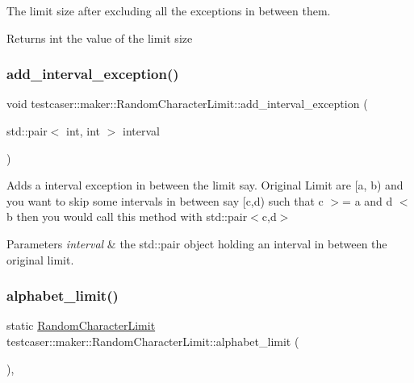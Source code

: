 The limit size after excluding all the exceptions in between them. 

\begin{DoxyReturn}{Returns}
int the value of the limit size 
\end{DoxyReturn}
\mbox{\label{classtestcaser_1_1maker_1_1RandomCharacterLimit_a9fac35205a15685a2ce671f9f38279ab}} 
\subsubsection{\texorpdfstring{add\_interval\_exception()}{add\_interval\_exception()}}
{\footnotesize\ttfamily void testcaser\+::maker\+::\+Random\+Character\+Limit\+::add\+\_\+interval\+\_\+exception (\begin{DoxyParamCaption}\item[{std\+::pair$<$ int, int $>$}]{interval }\end{DoxyParamCaption})\hspace{0.3cm}{\ttfamily [inline]}}



Adds a interval exception in between the limit say. Original Limit are \mbox{[}a, b) and you want to skip some intervals in between say \mbox{[}c,d) such that c $>$= a and d $<$ b then you would call this method with std\+::pair$<$c,d$>$ 


\begin{DoxyParams}{Parameters}
{\em interval} & the std\+::pair object holding an interval in between the original limit. \\
\hline
\end{DoxyParams}
\mbox{\label{classtestcaser_1_1maker_1_1RandomCharacterLimit_a4519263daf2737941039054c60c26ca5}} 
\subsubsection{\texorpdfstring{alphabet\_limit()}{alphabet\_limit()}}
{\footnotesize\ttfamily static \mbox{\hyperlink{classtestcaser_1_1maker_1_1RandomCharacterLimit}{Random\+Character\+Limit}} testcaser\+::maker\+::\+Random\+Character\+Limit\+::alphabet\+\_\+limit (\begin{DoxyParamCaption}{ }\end{DoxyParamCaption})\hspace{0.3cm}{\ttfamily [inline]}, {\ttfamily [static]}}



